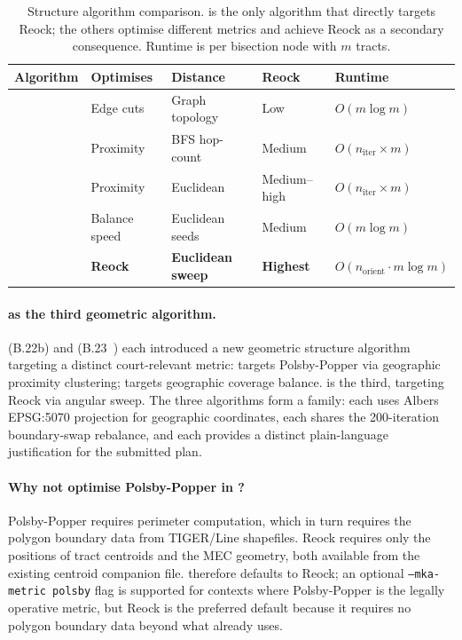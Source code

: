 \begin{table}[t]
\centering
\caption{%
  Structure algorithm comparison.
  \mka{} is the only algorithm that directly targets Reock; the others
  optimise different metrics and achieve Reock as a secondary consequence.
  Runtime is per bisection node with $m$ tracts.
}
\label{tab:algorithm-compare}
\renewcommand{\arraystretch}{1.3}
\begin{tabular}{@{}lllll@{}}
\toprule
Algorithm & Optimises & Distance & Reock & Runtime \\
\midrule
\metis{}  & Edge cuts & Graph topology & Low & $O(m \log m)$ \\
\cvd{}    & Proximity & BFS hop-count  & Medium & $O(n_{\mathrm{iter}} \times m)$ \\
\cvdgeo{} & Proximity & Euclidean      & Medium--high & $O(n_{\mathrm{iter}} \times m)$ \\
\bfsg{}   & Balance speed & Euclidean seeds & Medium & $O(m \log m)$ \\
\textbf{\mka{}} & \textbf{Reock} & \textbf{Euclidean sweep} & \textbf{Highest} & $O(n_{\mathrm{orient}} \cdot m \log m)$ \\
\bottomrule
\end{tabular}
\end{table}

\paragraph{\mka{} as the third geometric algorithm.}
\cvdgeo{} (B.22b) and \bfsg{} (B.23~\citep{dellaLibera2026bfs}) each
introduced a new geometric structure algorithm targeting a distinct court-relevant
metric: \cvdgeo{} targets Polsby-Popper via geographic proximity clustering;
\bfsg{} targets geographic coverage balance.
\mka{} is the third, targeting Reock via angular sweep.
The three algorithms form a family: each uses Albers EPSG:5070 projection for
geographic coordinates, each shares the 200-iteration boundary-swap rebalance,
and each provides a distinct plain-language justification for the submitted plan.

\paragraph{Why not optimise Polsby-Popper in \mka{}?}
Polsby-Popper requires perimeter computation, which in turn requires the
polygon boundary data from TIGER/Line shapefiles.
Reock requires only the positions of tract centroids and the MEC geometry,
both available from the existing centroid companion file.
\mka{} therefore defaults to Reock; an optional \texttt{--mka-metric polsby}
flag is supported for contexts where Polsby-Popper is the legally operative
metric, but Reock is the preferred default because it requires no polygon
boundary data beyond what \cvdgeo{} already uses.
